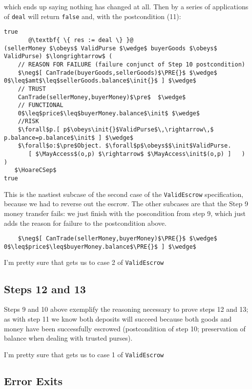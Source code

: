 \noindent which ends up saying nothing has changed at all.
Then by a series of applications of  \lstinline+deal+ will return \lstinline+false+ and,
with the postcondition (11):

\begin{lstlisting}[escapechar=@]
true
       @\textbf{ \{ res := deal \} }@
(sellerMoney $\obeys$ ValidPurse $\wedge$ buyerGoods $\obeys$ ValidPurse) $\longrightarrow$ (
    // REASON FOR FAILURE (failure conjunct of Step 10 postcondition)
    $\neg$[ CanTrade(buyerGoods,sellerGoods)$\PRE{}$ $\wedge$ 0$\leq$amt$\leq$sellerGoods.balance$\init{}$ ] $\wedge$
    // TRUST
    CanTrade(sellerMoney,buyerMoney)$\pre$  $\wedge$
    // FUNCTIONAL
    0$\leq$price$\leq$buyerMoney.balance$\init$ $\wedge$
    //RISK
    $\forall$p.[ p$\obeys\init{}$ValidPurse$\,\rightarrow\,$ p.balance=p.balance$\init$ ] $\wedge$
    $\forall$o:$\pre$Object. $\forall$p$\obeys$$\init$ValidPurse.
       [ $\MayAccess$(o,p) $\rightarrow$ $\MayAccess\init$(o,p) ]   ) )
   $\HoareCSep$
true
\end{lstlisting}

This is the nastiest subcase of the second case of the \lstinline+ValidEscrow+ specification,
because we had to reverse out the escrow. The other subcases are that the Step 9 money transfer fails:
we just finish with the poscondition from step 9, which just adds the reason for failure to the postcondition above.

\begin{lstlisting}
    $\neg$[ CanTrade(sellerMoney,buyerMoney)$\PRE{}$ $\wedge$ 0$\leq$price$\leq$buyerMoney.balance$\PRE{}$ ] $\wedge$
\end{lstlisting}

I'm pretty sure that gets us to case 2 of \lstinline+ValidEscrow+

\subsection{Steps 12 and 13}

Steps 9 and 10 above exemplify the reasoning necessary to prove steps
12 and 13; as with step 11 we know both deposits will succeed because
both goods and money have been successfully escrowed (postcondition of
step 10; preservation of balance when dealing with trusted purses).

I'm pretty sure that gets us to case 1 of \lstinline+ValidEscrow+

\subsection{Error Exits}

